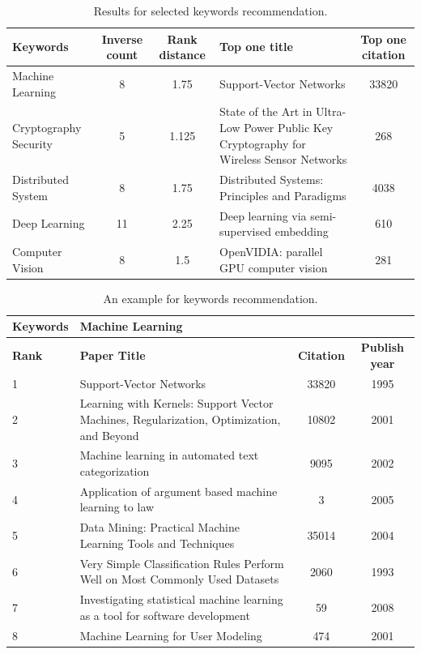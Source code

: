 \begin{table}[ht]
	\centering
	\begin{tabular}{lccp{6.5cm}c}
		\toprule
		\textbf{Keywords}	& \textbf{Inverse count} 	& \textbf{Rank distance} 	&\textbf{Top one title} &\textbf{Top one citation}\\ \midrule
		Machine Learning	& 8					& 1.75			&Support-Vector Networks &33820\\
		Cryptography Security& 5					& 1.125			&State of the Art in Ultra-Low Power Public Key Cryptography for Wireless Sensor Networks &268 \\
		Distributed System	& 8					& 1.75			&Distributed Systems: Principles and Paradigms & 4038\\
		Deep Learning		& 11					& 2.25			&Deep learning via semi-supervised embedding &610\\
		Computer Vision 	& 8					& 1.5				&OpenVIDIA: parallel GPU computer vision & 281\\
		\bottomrule
	\end{tabular}
	\vspace{3mm}
	\caption{Results for selected keywords recommendation. }
	\label{res:keywordall}
\end{table}

\begin{table}[ht]
	\centering
	\begin{tabular}{lp{12cm}cc}
		\textbf{Keywords}	& Machine Learning \\ \hline
		\toprule
		\textbf{Rank}		& \textbf{Paper Title} 		& \textbf{Citation} 	&\textbf{Publish year}\\ \midrule
		1				&Support-Vector Networks 	&33820 &1995\\
		2				&Learning with Kernels: Support Vector Machines, Regularization, Optimization, and Beyond &10802&2001\\
		3				&Machine learning in automated text categorization &9095&2002\\
		4				&Application of argument based machine learning to law &3&2005\\
		5				&Data Mining: Practical Machine Learning Tools and Techniques&35014&2004\\
		6				&Very Simple Classification Rules Perform Well on Most Commonly Used Datasets&2060&1993\\
		7				&Investigating statistical machine learning as a tool for software development &59&2008\\
		8				&Machine Learning for User Modeling & 474&2001\\
		\bottomrule
	\end{tabular}
	\vspace{3mm}
	\caption{An example for keywords recommendation. }
	\label{res:keywordexp}
\end{table}

